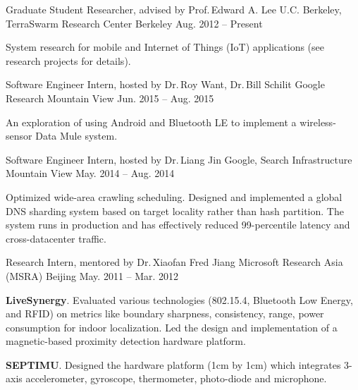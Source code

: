
\begin{cventries}

  \cventry
  {Graduate Student Researcher, advised by Prof.\,Edward A. Lee}
  {U.C. Berkeley, TerraSwarm Research Center}
  {Berkeley}
  {Aug. 2012 -- Present}
  {
    \begin{cvitems}
      System research for mobile and Internet of Things (IoT) applications (see
      research projects for details).
    \end{cvitems}
  }

  \cventry
  {Software Engineer Intern, hosted by Dr.\,Roy Want, Dr.\,Bill Schilit}
  {Google Research}
  {Mountain View}
  {Jun. 2015 -- Aug. 2015}
  {
    \begin{cvitems}
      An exploration of using Android and Bluetooth LE to implement a
      wireless-sensor Data Mule system.
    \end{cvitems}
  }

  \cventry
  {Software Engineer Intern, hosted by Dr.\,Liang Jin}
  {Google, Search Infrastructure}
  {Mountain View}
  {May. 2014 -- Aug. 2014}
  {
    \begin{cvitems}
      Optimized wide-area crawling scheduling. Designed and implemented a global
      DNS sharding system based on target locality rather than hash
      partition. The system runs in production and has effectively reduced
      99-percentile latency and cross-datacenter traffic.
    \end{cvitems}
  }

  \cventry
  {Research Intern, mentored by Dr.\,Xiaofan Fred Jiang}
  {Microsoft Research Asia (MSRA)}
  {Beijing}
  {May. 2011 -- Mar. 2012}
  {
    \begin{cvitems}
      \item \textbf{LiveSynergy}. Evaluated various technologies (802.15.4, Bluetooth
      Low Energy, and RFID) on metrics like boundary sharpness, consistency,
      range, power consumption for indoor localization. Led the design and
      implementation of a magnetic-based proximity detection hardware platform.
      \item \textbf{SEPTIMU}. Designed the hardware platform (1cm by 1cm) which
      integrates 3-axis accelerometer, gyroscope, thermometer, photo-diode and
      microphone.
    \end{cvitems}
  }

\end{cventries}

